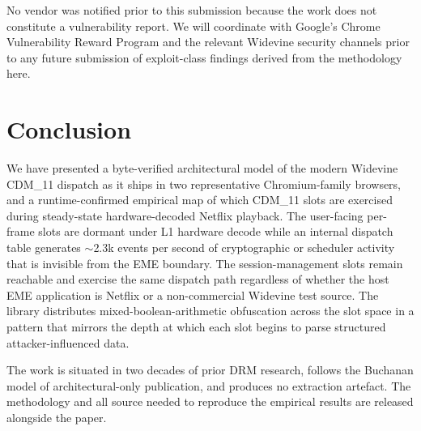 \documentclass[11pt,letterpaper]{article}
\let\oldsection\section
\renewcommand{\section}{\clearpage\oldsection}
\begin{document}
No vendor was notified prior to this submission because the work
does not constitute a vulnerability report. We will coordinate with
Google's Chrome Vulnerability Reward Program and the relevant
Widevine security channels prior to any future submission of
exploit-class findings derived from the methodology here.

\section{Conclusion}
\label{sec:conclusion}

We have presented a byte-verified architectural model of the modern
Widevine CDM\_11 dispatch as it ships in two representative
Chromium-family browsers, and a runtime-confirmed empirical map of
which CDM\_11 slots are exercised during steady-state
hardware-decoded Netflix playback. The user-facing per-frame slots
are dormant under L1 hardware decode while an internal dispatch
table generates $\sim$2.3k events per second of cryptographic or
scheduler activity that is invisible from the EME boundary. The
session-management slots remain reachable and exercise the same
dispatch path regardless of whether the host EME application is
Netflix or a non-commercial Widevine test source. The library
distributes mixed-boolean-arithmetic obfuscation across the slot
space in a pattern that mirrors the depth at which each slot
begins to parse structured attacker-influenced data.

The work is situated in two decades of prior DRM research, follows
the Buchanan model of architectural-only publication, and produces
no extraction artefact. The methodology and all source needed to
reproduce the empirical results are released alongside the paper.
\end{document}
